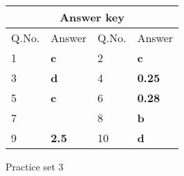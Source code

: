 \setlength\arrayrulewidth{1pt}
\begin{table}[H]
	\centering
	
	\begin{tabular}{|p{1.5cm}|p{1.5cm}||p{1.5cm}|p{1.5cm}|}
		\hline
		\multicolumn{4}{|c|}{\textbf{Answer key}}\\\hline\hline
		\rowcolor{ocrel}Q.No.&Answer&Q.No.&Answer\\\hline
		1&\textbf{c}&2&\textbf{c}\\\hline
		3&\textbf{d}&4&\textbf{0.25}\\\hline
		5&\textbf{c}&6&\textbf{0.28}\\\hline
		7&\textbf{}&8&\textbf{b}\\\hline
		9&\textbf{2.5}&10&\textbf{d}\\\hline
	\end{tabular}
\end{table}
\newpage
\begin{abox}
	Practice set 3
	\end{abox}
